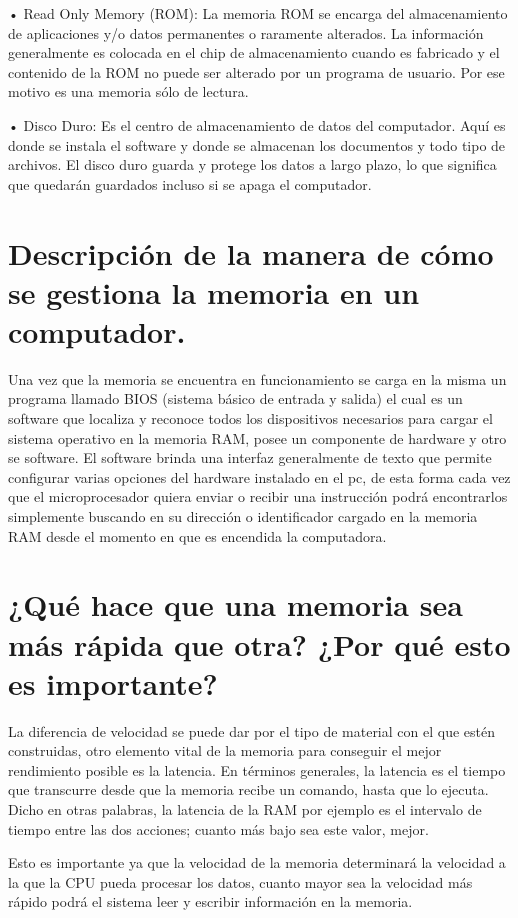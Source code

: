 \documentclass{article}
\begin{document}
•	Read Only Memory (ROM): La memoria ROM se encarga del almacenamiento de aplicaciones y/o datos permanentes o raramente alterados. La información generalmente es colocada en el chip de almacenamiento cuando es fabricado y el contenido de la ROM no puede ser alterado por un programa de usuario. Por ese motivo es una memoria sólo de lectura.
\newline

•	Disco Duro: Es el centro de almacenamiento de datos del computador. Aquí es donde se instala el software y donde se almacenan los documentos y todo tipo de archivos. El disco duro guarda y protege los datos a largo plazo, lo que significa que quedarán guardados incluso si se apaga el computador. \cite{GCFGLOBAL} \cite{Graciela}

\section{Descripción de la manera de cómo se gestiona la memoria en un computador.}\label{contenido}
Una vez que la memoria se encuentra en funcionamiento se carga en la misma un programa llamado BIOS (sistema básico de entrada y salida) el cual es un software que localiza y reconoce todos los dispositivos necesarios para cargar el sistema operativo en la memoria RAM, posee un componente de hardware y otro se software. El software brinda una interfaz generalmente de texto que permite configurar varias opciones del hardware instalado en el pc, de esta forma cada vez que el microprocesador quiera enviar o recibir una instrucción podrá encontrarlos simplemente buscando en su dirección o identificador cargado en la memoria RAM desde el momento en que es encendida la computadora. \cite{Augusto} \cite{Vikidia}

\section{¿Qué hace que una memoria sea más rápida que otra? ¿Por qué esto es importante?}\label{contenido}
La diferencia de velocidad se puede dar por el tipo de material con el que estén construidas, otro elemento vital de la memoria para conseguir el mejor rendimiento posible es la latencia. En términos generales, la latencia es el tiempo que transcurre desde que la memoria recibe un comando, hasta que lo ejecuta. Dicho en otras palabras, la latencia de la RAM por ejemplo es el intervalo de tiempo entre las dos acciones; cuanto más bajo sea este valor, mejor.
\newline 
\vspace{0,5cm}

Esto es importante ya que la velocidad de la memoria determinará la velocidad a la que la CPU pueda procesar los datos, cuanto mayor sea la velocidad más rápido podrá el sistema leer y escribir información en la memoria. \cite{tarjetas} \cite{grupo}
\newpage




\end{document}

